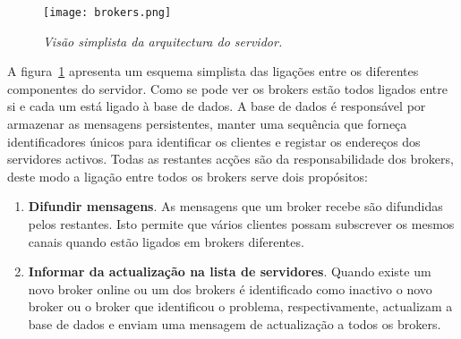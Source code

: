 \begin{figure}[H]
\centering
\texttt{[image: brokers.png]}
\caption{\textit{Visão simplista da arquitectura do servidor.}}
\label{fig:brokers-arq}
\end{figure}

A figura~\ref{fig:brokers-arq} apresenta um esquema simplista das ligações entre os diferentes componentes do servidor. Como se pode ver os brokers estão todos ligados entre si e cada um está ligado à base de dados.
A base de dados é responsável por armazenar as mensagens persistentes, manter uma sequência que forneça identificadores únicos para identificar os clientes e registar os endereços dos servidores activos. Todas as restantes acções são da responsabilidade dos brokers, deste modo a ligação entre todos os brokers serve dois propósitos:

\begin{enumerate}
\item \textbf{Difundir mensagens}. As mensagens que um broker recebe são difundidas pelos restantes. Isto permite que vários clientes possam subscrever os mesmos canais quando estão ligados em brokers diferentes.
\item \textbf{Informar da actualização na lista de servidores}. Quando existe um novo broker online ou um dos brokers é identificado como inactivo o novo broker ou o broker que identificou o problema, respectivamente, actualizam a base de dados e enviam uma mensagem de actualização a todos os brokers.
\end{enumerate}


